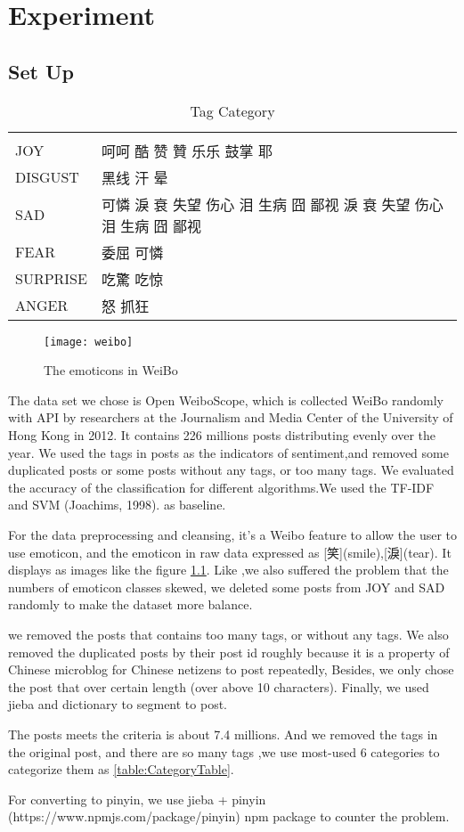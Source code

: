 \chapter{Experiment}

\section{Set Up}

\begin{table}[]
\centering
\caption{Tag Category}
\label{CategoryTable}
\begin{tabular}{ll}
      &  \\
JOY  & 呵呵 酷 赞 贊 乐乐 鼓掌 耶 \\
DISGUST & 黑线 汗 晕 \\
SAD &   可憐 淚 衰 失望 伤心 泪 生病 囧 鄙视  淚 衰 失望 伤心 泪 生病 囧 鄙视  \\
FEAR &  委屈  可憐 \\
SURPRISE &  吃驚 吃惊 \\
ANGER & 怒 抓狂
\end{tabular}
\end{table}

\begin{figure}[h]
    \centering
	\texttt{[image: weibo]}
    \caption{The emoticons in WeiBo}
    \label{fig:weibo}
\end{figure}

The data set we chose is Open WeiboScope\cite{fu2013reality}, which is collected WeiBo randomly with API by researchers at the Journalism and Media Center of the University of Hong Kong in 2012. 
It contains 226 millions posts distributing evenly over the year. We used the tags in posts as the indicators of sentiment,and removed some duplicated posts or some posts without any tags, or too many tags. 
We evaluated the accuracy of the classification for different algorithms.We used the TF-IDF and SVM (Joachims, 1998). as baseline.

For the data preprocessing and cleansing, it's a Weibo feature to allow the user to use emoticon, 
and the emoticon in raw data expressed as [笑](smile),[淚](tear). It displays as images like the figure \ref{fig:weibo}. 
Like \cite{zhao2012moodlens},we also suffered the problem that the numbers of emoticon classes skewed,
 we deleted some posts from JOY and SAD randomly to make the dataset more balance.  

we removed the posts that contains too many tags, or without any tags. We also removed the duplicated posts by their post id roughly because it is a property of Chinese microblog \cite{fu2013reality} for Chinese netizens to post repeatedly, 
Besides, we only chose the post that over certain length (over above 10 characters). Finally, we used jieba and dictionary to segment to post.

The posts meets the criteria is about 7.4 millions. And we removed the tags in the original post, and there are so many tags 
,we use most-used 6 categories to categorize them as \ref{table:CategoryTable}.

For converting to pinyin, we use jieba + pinyin (https://www.npmjs.com/package/pinyin) npm package to counter the problem.
